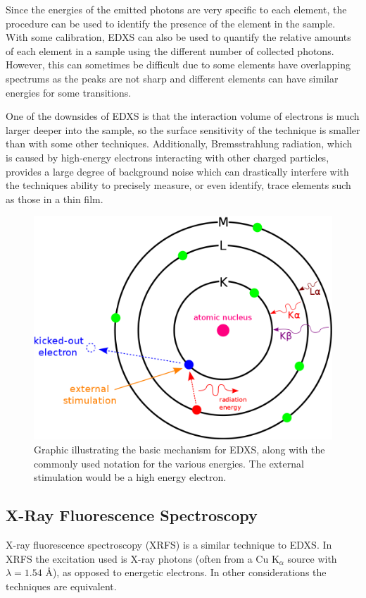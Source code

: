 Since the energies of the emitted photons are very specific to each element, the procedure can be used to identify the presence of the element in the sample. With some calibration, EDXS can also be used to quantify the relative amounts of each element in a sample using the different number of collected photons. However, this can sometimes be difficult due to some elements have overlapping spectrums as the peaks are not sharp and different elements can have similar energies for some transitions. 

One of the downsides of EDXS is that the interaction volume of electrons is much larger deeper into the sample, so the surface sensitivity of the technique is smaller than with some other techniques. Additionally, Bremsstrahlung radiation, which is caused by high-energy electrons interacting with other charged particles, provides a large degree of background noise which can drastically interfere with the techniques ability to precisely measure, or even identify, trace elements such as those in a thin film. 

\begin{figure}[tb]
   \centering
   \includegraphics[width=0.66\linewidth]{./figures/characterization/EDXS-scheme} 
   \caption[Illustration of EDXS principle]%
   		{Graphic illustrating the basic mechanism for EDXS, along with the commonly used %
		notation for the various energies. The external stimulation would be a high energy %
		electron.}
   \label{fig:EDXS-image}
\end{figure}




\subsection{X-Ray Fluorescence Spectroscopy}

X-ray fluorescence spectroscopy (XRFS) is a similar technique to EDXS. In XRFS the excitation used is X-ray photons (often from a Cu K$_{\alpha}$ source with $\lambda = 1.54$ \AA), as opposed to energetic electrons. In other considerations the techniques are equivalent. 

